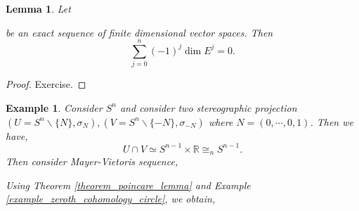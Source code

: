 \documentclass[10pt]{article}
\newtheorem{lemma}{Lemma}[section]
\newtheorem{example}{Example}[section]
\newcommand{\R}[0]{\mathbb{R}}
\begin{document}
\begin{lemma}
  Let 
  \begin{center}
  \end{center}
  be an exact sequence of finite dimensional vector spaces. Then 
  \begin{equation*}
    \sum_{j=0}^n (-1)^j\dim E^j = 0.
  \end{equation*}
\end{lemma}

\begin{proof}
  Exercise.
\end{proof}

\begin{example}
  Consider $S^n$ and consider two stereographic projection $(U=S^n\backslash\{N\},\sigma_N),(V=S^n\backslash\{-N\},\sigma_{-N})$ where $N=(0,\cdots,0,1)$. Then we have,
  \begin{equation*}
    U\cap V\simeq S^{n-1}\times \R\cong_n S^{n-1}.
  \end{equation*}
  Then consider Mayer-Vietoris sequence,
  \begin{center}
  \end{center}
  Using Theorem \ref{theorem_poincare_lemma} and Example \ref{example_zeroth_cohomology_circle}, we obtain,
  \begin{center}
\end{center}
\end{example}
\end{document}
